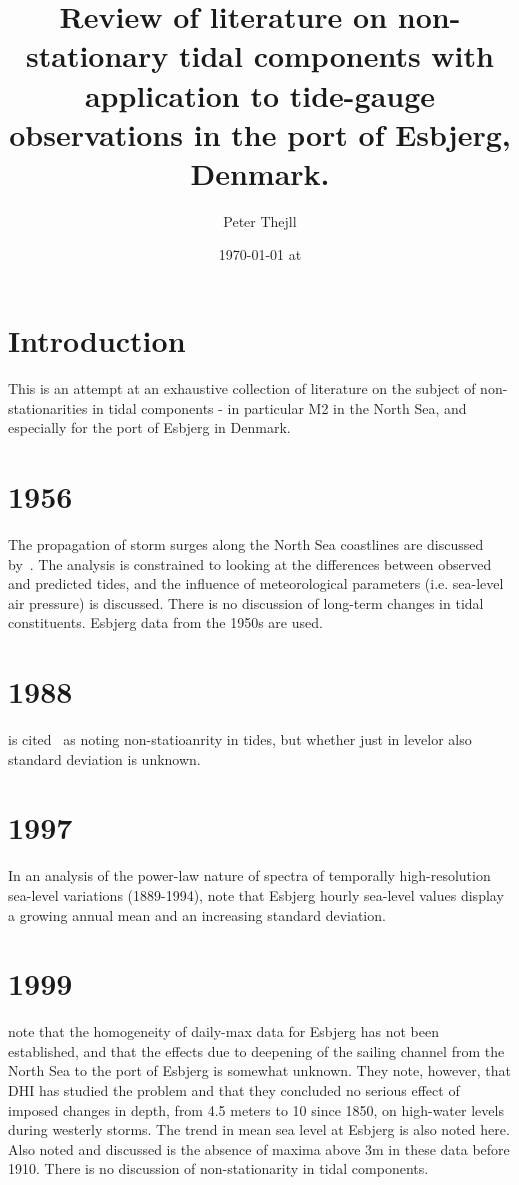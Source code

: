 \documentclass[12pt,a4]{article}
\title{Review of literature on non-stationary tidal components with application to tide-gauge observations in the port of Esbjerg, Denmark.}
\author{Peter Thejll}
\date{{\today}  at {\currenttime}}
\begin{document}
\maketitle

\section{Introduction}
This is an attempt at an exhaustive collection of literature on the subject of non-stationarities in tidal components - in particular M2 in the North Sea, and especially for the port of Esbjerg in Denmark.


\section{1956}
The propagation of storm surges along the North Sea coastlines are discussed by~\cite{Darbyshire1956}.
The analysis is constrained to looking at the differences between observed and predicted tides, and the influence of meteorological parameters (i.e. sea-level air pressure) is discussed. There is no discussion of long-term changes in tidal constituents. Esbjerg data from the 1950s are used.

\section{1988}
\cite{Pugh1988} is cited~\citep{Dimon1997a} as noting non-statioanrity in tides, but whether just in levelor also standard deviation is unknown.

\section{1997}
In an analysis of the power-law nature of spectra of temporally high-resolution sea-level variations (1889-1994), \cite{Dimon1997a} note that Esbjerg hourly sea-level values display a growing annual mean  and an increasing standard deviation.

\section{1999}
\cite{Bijl1999} note that the homogeneity of daily-max data for Esbjerg has not been established, and that the effects due to deepening of the sailing channel from the North Sea to the port of Esbjerg is somewhat unknown. They note, however, that DHI has studied the problem and that they concluded no serious effect of imposed changes in depth, from 4.5 meters to 10 since 1850, on high-water levels during westerly storms. The trend in mean sea level at Esbjerg is also noted here. Also noted and discussed is the absence of maxima above 3m in these data before 1910. There is no discussion of non-stationarity in tidal components.
\end{document}
